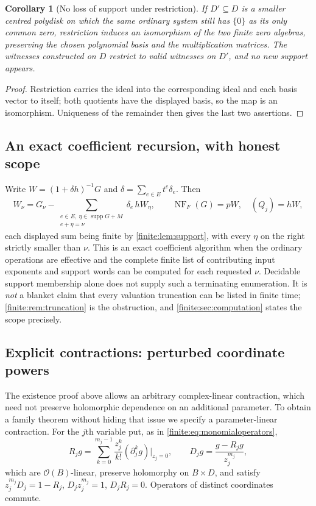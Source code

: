 \documentclass[11pt,letterpaper]{article}
\newtheorem{corollary}[theorem]{Corollary}
\theoremstyle{definition}
\theoremstyle{remark}
\newcommand{\OO}{\mathcal O}
\DeclareMathOperator{\supp}{supp}
\DeclareMathOperator{\NF}{NF}
\numberwithin{equation}{section}
\begin{document}
\begin{corollary}[No loss of support under restriction]
\label{finite:cor:restriction}
If $D'\subseteq D$ is a smaller centred polydisk on which the same ordinary system still has $\{0\}$ as its only common zero, restriction induces an isomorphism of the two finite zero algebras, preserving the chosen polynomial basis and the multiplication matrices. The witnesses constructed on $D$ restrict to valid witnesses on $D'$, and no new support appears.
\end{corollary}

\begin{proof}
Restriction carries the ideal into the corresponding ideal and each basis vector to itself; both quotients have the displayed basis, so the map is an isomorphism. Uniqueness of the remainder then gives the last two assertions.
\end{proof}

\subsection{An exact coefficient recursion, with honest scope}
\label{finite:sec:recursion}

Write $W=(1+\delta h)^{-1}G$ and $\delta=\sum_{e\in E}t^e\delta_e$. Then
\begin{equation}\label{finite:eq:recursion}
 W_\nu=G_\nu-\sum_{\substack{e\in E,\ \eta\in\supp G+M\\ e+\eta=\nu}}\delta_e\,hW_\eta,
 \qquad
 \NF_F(G)=pW,\quad (Q_j)=hW,
\end{equation}
each displayed sum being finite by \cref{finite:lem:support}, with every $\eta$ on the right strictly smaller than $\nu$. This is an exact coefficient algorithm when the ordinary operations are effective and the complete finite list of contributing input exponents and support words can be computed for each requested $\nu$. Decidable support membership alone does not supply such a terminating enumeration. It is \emph{not} a blanket claim that every valuation truncation can be listed in finite time; \cref{finite:rem:truncation} is the obstruction, and \cref{finite:sec:computation} states the scope precisely.

\subsection{Explicit contractions: perturbed coordinate powers}
\label{finite:sec:family}

The existence proof above allows an arbitrary complex-linear contraction, which need not preserve holomorphic dependence on an additional parameter. To obtain a family theorem without hiding that issue we specify a parameter-linear contraction. For the $j$th variable put, as in \eqref{finite:eq:monomialoperators},
\begin{equation}\label{finite:eq:Rj}
 R_jg=\sum_{k=0}^{m_j-1}\frac{z_j^k}{k!}(\partial_j^kg)|_{z_j=0},
 \qquad
 D_jg=\frac{g-R_jg}{z_j^{m_j}} ,
\end{equation}
which are $\OO(B)$-linear, preserve holomorphy on $B\times D$, and satisfy $z_j^{m_j}D_j=1-R_j$, $D_jz_j^{m_j}=1$, $D_jR_j=0$. Operators of distinct coordinates commute.
\end{document}
